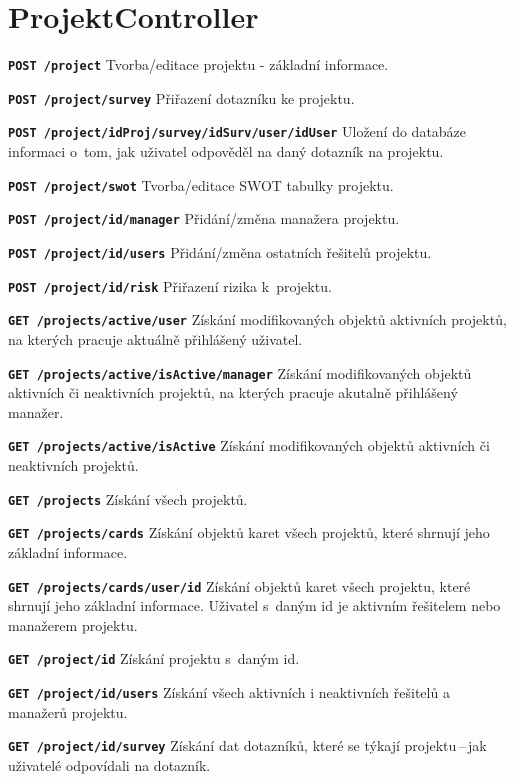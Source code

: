 \section{ProjektController}
\begin{DESCRIPTION}
\item \texttt{\textbf{POST /project}} Tvorba/editace projektu - základní informace.
\item \texttt{\textbf{POST /project/survey}} Přiřazení dotazníku ke projektu.
\item \texttt{\textbf{POST /project/{idProj}/survey/{idSurv}/user/{idUser}}} Uložení do databáze informaci o~tom, jak uživatel odpověděl na daný dotazník na projektu.
\item \texttt{\textbf{POST /project/swot}} Tvorba/editace SWOT tabulky projektu.
\item \texttt{\textbf{POST /project/{id}/manager}} Přidání/změna manažera projektu.
\item \texttt{\textbf{POST /project/{id}/users}} Přidání/změna ostatních řešitelů projektu.
\item \texttt{\textbf{POST /project/{id}/risk}} Přiřazení rizika k~projektu.
\item \texttt{\textbf{GET /projects/active/user}} Získání modifikovaných objektů aktivních projektů, na kterých pracuje aktuálně přihlášený uživatel. 
\item \texttt{\textbf{GET /projects/active/{isActive}/manager}} Získání modifikovaných objektů aktivních či neaktivních projektů, na kterých pracuje akutalně přihlášený manažer. 
\item \texttt{\textbf{GET /projects/active/{isActive}}} Získání modifikovaných objektů aktivních či neaktivních projektů.
\item \texttt{\textbf{GET /projects}} Získání všech projektů.
\item \texttt{\textbf{GET /projects/cards}} Získání objektů karet všech projektů, které shrnují jeho základní informace.
\item \texttt{\textbf{GET /projects/cards/user/{id}}} Získání objektů karet všech projektu, které shrnují jeho základní informace. Uživatel s~daným id je aktivním řešitelem nebo manažerem projektu.
\item \texttt{\textbf{GET /project/{id}}} Získání projektu s~daným id.
\item \texttt{\textbf{GET /project/{id}/users}} Získání všech aktivních i neaktivních řešitelů a manažerů projektu.
\item \texttt{\textbf{GET /project/{id}/survey}} Získání dat dotazníků, které se týkají projektu\,--\,jak uživatelé odpovídali na dotazník.

\end{DESCRIPTION}
